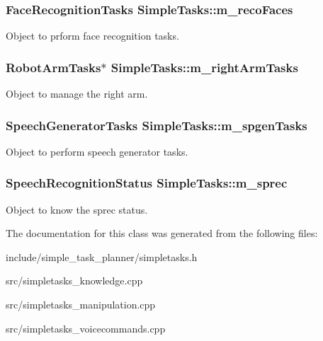 \subsubsection[{\texorpdfstring{m\+\_\+reco\+Faces}{m_recoFaces}}]{\setlength{\rightskip}{0pt plus 5cm}Face\+Recognition\+Tasks Simple\+Tasks\+::m\+\_\+reco\+Faces\hspace{0.3cm}{\ttfamily [private]}}\hypertarget{class_simple_tasks_a7fb0ede1319b6a8acc7b4e733e494f40}{}\label{class_simple_tasks_a7fb0ede1319b6a8acc7b4e733e494f40}
Object to prform face recognition tasks. 
\subsubsection[{\texorpdfstring{m\+\_\+right\+Arm\+Tasks}{m_rightArmTasks}}]{\setlength{\rightskip}{0pt plus 5cm}Robot\+Arm\+Tasks$\ast$ Simple\+Tasks\+::m\+\_\+right\+Arm\+Tasks\hspace{0.3cm}{\ttfamily [private]}}\hypertarget{class_simple_tasks_a0c9ef13ebff2b2ca0ff6dbd6aa5d641b}{}\label{class_simple_tasks_a0c9ef13ebff2b2ca0ff6dbd6aa5d641b}
Object to manage the right arm. 
\subsubsection[{\texorpdfstring{m\+\_\+spgen\+Tasks}{m_spgenTasks}}]{\setlength{\rightskip}{0pt plus 5cm}Speech\+Generator\+Tasks Simple\+Tasks\+::m\+\_\+spgen\+Tasks\hspace{0.3cm}{\ttfamily [private]}}\hypertarget{class_simple_tasks_a6f47514f5e71977a2ff123311ad3dec2}{}\label{class_simple_tasks_a6f47514f5e71977a2ff123311ad3dec2}
Object to perform speech generator tasks. 
\subsubsection[{\texorpdfstring{m\+\_\+sprec}{m_sprec}}]{\setlength{\rightskip}{0pt plus 5cm}Speech\+Recognition\+Status Simple\+Tasks\+::m\+\_\+sprec\hspace{0.3cm}{\ttfamily [private]}}\hypertarget{class_simple_tasks_a1459e7794f0b070486266456dbbc89c5}{}\label{class_simple_tasks_a1459e7794f0b070486266456dbbc89c5}
Object to know the sprec status. 

The documentation for this class was generated from the following files\+:\begin{DoxyCompactItemize}
\item 
include/simple\+\_\+task\+\_\+planner/simpletasks.\+h\item 
src/simpletasks\+\_\+knowledge.\+cpp\item 
src/simpletasks\+\_\+manipulation.\+cpp\item 
src/simpletasks\+\_\+voicecommands.\+cpp\end{DoxyCompactItemize}
